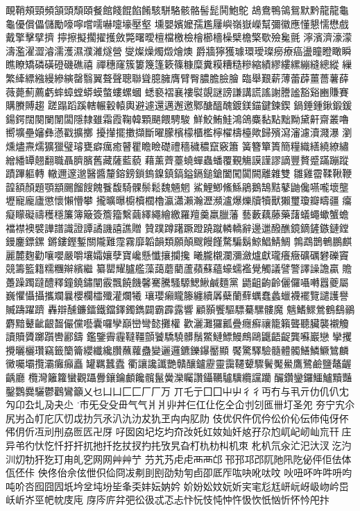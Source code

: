 靦鞘頰頸頻頷頭頹頤餐館餞餛餡餚駭駢駱骸骼髻髭鬨鮑鴕
鴣鴦鴨鴒鴛默黔龍⿓龜⿔優償儡儲勵嚎嚀嚐嚅嚇嚏壕壓壑
壎嬰嬪嬤孺尷屨嶼嶺嶽嶸幫彌徽應懂懇懦懋戲戴擎擊擘擠
擰擦擬擱擢擭斂斃曙曖檀檔檄檢檜櫛檣橾檗檐檠歜殮毚氈
濘濱濟濠濛濤濫濯澀濬濡濩濕濮濰燧營燮燦燥燭燬燴燠
爵牆獰獲璩環璦璨癆療癌盪瞳瞪瞰瞬瞧瞭矯磷磺磴磯礁禧
禪穗窿簇簍篾篷簌篠糠糜糞糢糟糙糝縮績繆縷縲繃縫總縱
繅繁縴縹繈縵縿縯罄翳翼聱聲聰聯聳臆臃膺臂臀膿膽臉膾
臨舉艱薪薄蕾薜薑薔薯薛薇薨薊薦虧蟀蟑螳蟒蟆螫螻螺蟈
蟋褻褶襄褸褽覬謎謗謙講謊謠謝謄謐豁谿豳賺賽購賸賻趨
蹉蹋蹈蹊轄輾轂轅輿避遽還邁邂邀鄹醣醞醜鍍鎂錨鍵鍊鍥
鍋錘鍾鍬鍛鍰鍚鍔闊闋闌闈闆隱隸雖霜霞鞠韓顆颶餵騁駿
鮮鮫鮪鮭鴻鴿麋黏點黜黝黛鼾齋叢嚕嚮壙壘嬸彝懣戳擴擲
擾攆擺擻擷斷曜朦檳檬櫃檻檸櫂檮檯歟歸殯瀉瀋濾瀆濺瀑
瀏燻燼燾燸獷獵璧璿甕癖癘癒瞽瞿瞻瞼礎禮穡穢穠竄竅簫
簧簪簞簣簡糧織繕繞繚繡繒繙罈翹翻職聶臍臏舊藏薩藍藐
藉薰薺薹蟯蟬蟲蟠覆覲觴謨謹謬謫豐贅蹙蹣蹦蹤蹟蹕軀轉
轍邇邃邈醫醬釐鎔鎊鎖鎢鎳鎮鎬鎰鎘鎚鎗闔闖闐闕離雜雙
雛雞霤鞣鞦鞭韹額顏題顎顓颺餾餿餽餮馥騎髁鬃鬆魏魎魍
鯊鯉鯽鯈鯀鵑鵝鵠黠鼕鼬儳嚥嚨壞壟壢寵龐廬懲懷懶懵攀
攏曠曝櫥櫝櫚櫓瀛瀟瀨瀚瀝瀕瀘爆爍牘犢獸獺璽瓊瓣疇疆
癟癡矇礙禱穫穩簾簿簸簽簷籀繫繭繹繩繪繳羅羶羹羸臘藩
藝藪藕藤藥藷蟻蠅蠍蟹蟾襠襟襖襞譁譜識證譚譎譏譆譙贈
贊蹼蹲躇蹶蹬蹺蹴轔轎辭邊邋醱醮鏡鏑鏟鏃鏈鏜鏝鏖鏢鏍
鏘鏤鏗鏨關隴難霪霧靡韜韻類願顛颼饅饉騖騙鬍鯨鯧鯖鯛
鶉鵡鵲鵪鵬麒麗麓麴勸嚷嚶嚴嚼壤孀孃孽寶巉懸懺攘攔攙
曦朧櫬瀾瀰瀲爐獻瓏癢癥礦礪礬礫竇競籌籃籍糯糰辮繽繼
纂罌耀臚艦藻藹蘑藺蘆蘋蘇蘊蠔蠕襤覺觸議譬警譯譟譫贏
贍躉躁躅躂醴釋鐘鐃鏽闡霰飄饒饑馨騫騰騷騵鰓鰍鹹麵黨
鼯齟齣齡儷儸囁囀囂夔屬巍懼懾攝攜斕曩櫻欄櫺殲灌爛犧
瓖瓔癩矓籐纏續羼蘗蘭蘚蠣蠢蠡蠟襪襬覽譴護譽贓躊躍躋
轟辯醺鐮鐳鐵鐺鐸鐲鐫闢霸霹露響顧顥饗驅驃驀騾髏魔
魑鰭鰥鶯鶴鷂鶸麝黯鼙齜齦齧儼儻囈囊囉孿巔巒彎懿攤權
歡灑灘玀瓤疊癮癬禳籠籟聾聽臟襲襯觼讀贖贗躑躓轡酈鑄
鑑鑒霽霾韃韁顫饕驕驍髒鬚鱉鰱鰾鰻鷓鷗鼴齬齪龔囌巖戀
攣攫攪曬欐瓚竊籤籣籥纓纖纔臢蘸蘿蠱變邐邏鑣鑠鑤靨顯
饜驚驛驗髓體髑鱔鱗鱖鷥麟黴囑壩攬灞癱癲矗罐羈蠶蠹
衢讓讒讖艷贛釀鑪靂靈靄韆顰驟鬢魘鱟鷹鷺鹼鹽鼇齷齲廳
欖灣籬籮蠻觀躡釁鑲鑰顱饞髖鬣黌灤矚讚鑷韉驢驥纜讜躪
釅鑽鑾鑼鱷鱸黷豔鑿鸚爨驪鬱鸛鸞籲乂乜⼐凵⼕匚⼚厂万
丌乇亍⼞囗⼬屮⼻彳丏冇与丮亓仂仉仈冘勼卬厹圠夃夬尐
巿旡⽎殳毌⽓气⽙爿丱丼仨仜仩仡仝仚刌刉匜卌圢圣夗
夯宁宄尒尻屴屳帄庀庂忉戉扐氕氶汃氿氻犮犰玊⽱禸肊阞
伎优伬仵伔仱伀价伈伝伂伅伢伓伄仴伒冱刓刐劦匢匟卍厊
吇囡囟圮圪圴夼妀奼妅奻奾奷奿孖尕尥屼屺屻屾巟幵庄
异弚彴忕忔忏扜扞扤扡扦扢扙扠扚扥攷旯旮朾朹朸朻机朿
朼朳氘汆汒汜汏汊汔汋汌灱牞犴犵玎甪癿穵⽹网⾋艸艼
芀艽艿⾌虍⾑襾邙邗邘邛邔阢阤阠阣佖伻佢佉体佤伾佧
佒佟佁佘伭伳伿佡冏冹刜刞刡劭劮匉卣卲厎厏吰吷吪呔呅
吙吜吥吘吽呏呁吨吤呇囮囧囥坁坅坌坉坋坒夆奀妦妘妠妗
妎妢妐妏妧妡宎宒尨尪岍岏岈岋岉岒岊岆岓岕巠帊帎庋庉
庌庈庍弅弝彸彶忒忑忐忭忨忮忳忡忤忣忺忯忷忻怀忴戺抃

